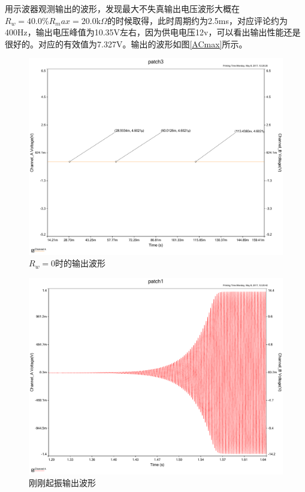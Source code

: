 \documentclass[UTF8,a4paper]{paper}
\begin{document}
用示波器观测输出的波形，发现最大不失真输出电压波形大概在$R_w=40.0\%R_max=20.0\mathrm{k}\Omega$的时候取得，此时周期约为2.5ms，对应评论约为400Hz，输出电压峰值为10.35V左右，因为供电电压12v，可以看出输出性能还是很好的。对应的有效值为7.327V。输出的波形如图\ref{ACmax}所示。
\begin {figure}
\includegraphics [width=\textwidth]{0ac.pdf}
\caption{$R_w=0$时的输出波形}
\label{AC0}
\end {figure}
\begin {figure}
\centering
\includegraphics [width=\textwidth]{startac.pdf}
\caption{刚刚起振输出波形}
\label{ACstart}
\end {figure}
\end{document}
